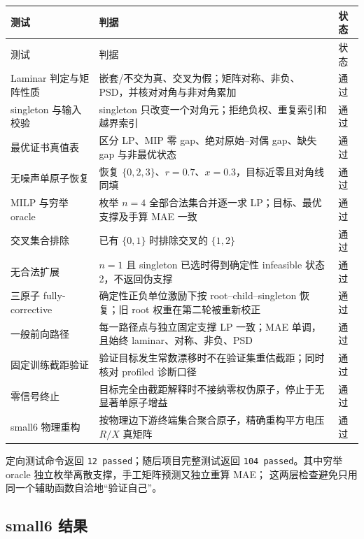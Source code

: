 \documentclass[UTF8,11pt]{ctexart}
\begin{document}
\begin{longtable}{>{\raggedright\arraybackslash}p{}>{\raggedright\arraybackslash}p{}p{}}
\toprule
测试 & 判据 & 状态 \\
\midrule
\endfirsthead
\toprule
测试 & 判据 & 状态 \\
\midrule
\endhead
Laminar 判定与矩阵性质 & 嵌套/不交为真、交叉为假；矩阵对称、非负、PSD，并核对对角与非对角累加 & 通过 \\
singleton 与输入校验 & singleton 只改变一个对角元；拒绝负权、重复索引和越界索引 & 通过 \\
最优证书真值表 & 区分 LP、MIP 零 gap、绝对原始--对偶 gap、缺失 gap 与非最优状态 & 通过 \\
无噪声单原子恢复 & 恢复 $\{0,2,3\}$、$r=0.7$、$x=0.3$，目标近零且对角线同填 & 通过 \\
MILP 与穷举 oracle & 枚举 $n=4$ 全部合法集合并逐一求 LP；目标、最优支撑及手算 MAE 一致 & 通过 \\
交叉集合排除 & 已有 $\{0,1\}$ 时排除交叉的 $\{1,2\}$ & 通过 \\
无合法扩展 & $n=1$ 且 singleton 已选时得到确定性 infeasible 状态 2，不返回伪支撑 & 通过 \\
三原子 fully-corrective & 确定性正负单位激励下按 root--child--singleton 恢复；旧 root 权重在第二轮被重新校正 & 通过 \\
一般前向路径 & 每一路径点与独立固定支撑 LP 一致；MAE 单调，且始终 laminar、对称、非负、PSD & 通过 \\
固定训练截距验证 & 验证目标发生常数漂移时不在验证集重估截距；同时核对 profiled 诊断口径 & 通过 \\
零信号终止 & 目标完全由截距解释时不接纳零权伪原子，停止于无显著单原子增益 & 通过 \\
small6 物理重构 & 按物理边下游终端集合聚合原子，精确重构平方电压 $R/X$ 真矩阵 & 通过 \\
\bottomrule
\end{longtable}

定向测试命令返回 \texttt{12 passed}；随后项目完整测试返回
\texttt{104 passed}。其中穷举 oracle 独立枚举离散支撑，手工矩阵预测又独立重算 MAE；
这两层检查避免只用同一个辅助函数自洽地“验证自己”。

\subsection{small6 结果}

\end{document}

